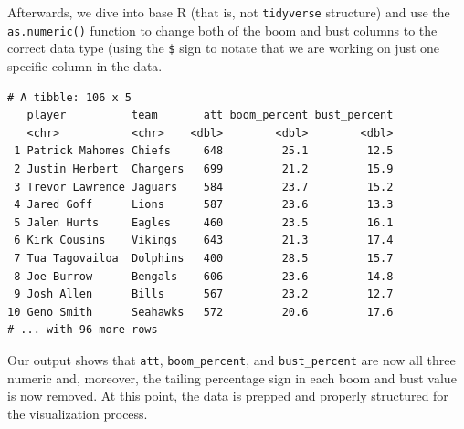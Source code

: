\documentclass[
  letterpaper,
]{krantz}
\newenvironment{Shaded}{\begin{snugshade}}{\end{snugshade}}
\newcommand{\AttributeTok}[1]{\textcolor[rgb]{0.40,0.45,0.13}{#1}}
\newcommand{\FunctionTok}[1]{\textcolor[rgb]{0.28,0.35,0.67}{#1}}
\newcommand{\NormalTok}[1]{\textcolor[rgb]{0.00,0.23,0.31}{#1}}
\newcommand{\OtherTok}[1]{\textcolor[rgb]{0.00,0.23,0.31}{#1}}
\newcommand{\SpecialCharTok}[1]{\textcolor[rgb]{0.37,0.37,0.37}{#1}}
\newcommand{\StringTok}[1]{\textcolor[rgb]{0.13,0.47,0.30}{#1}}
\begin{document}
Afterwards, we dive into base R (that is, not \texttt{tidyverse}
structure) and use the \texttt{as.numeric()} function to change both of
the boom and bust columns to the correct data type (using the
\texttt{\$} sign to notate that we are working on just one specific
column in the data.

\begin{Shaded}
\end{Shaded}

\begin{verbatim}
# A tibble: 106 x 5
   player          team       att boom_percent bust_percent
   <chr>           <chr>    <dbl>        <dbl>        <dbl>
 1 Patrick Mahomes Chiefs     648         25.1         12.5
 2 Justin Herbert  Chargers   699         21.2         15.9
 3 Trevor Lawrence Jaguars    584         23.7         15.2
 4 Jared Goff      Lions      587         23.6         13.3
 5 Jalen Hurts     Eagles     460         23.5         16.1
 6 Kirk Cousins    Vikings    643         21.3         17.4
 7 Tua Tagovailoa  Dolphins   400         28.5         15.7
 8 Joe Burrow      Bengals    606         23.6         14.8
 9 Josh Allen      Bills      567         23.2         12.7
10 Geno Smith      Seahawks   572         20.6         17.6
# ... with 96 more rows
\end{verbatim}

Our output shows that \texttt{att}, \texttt{boom\_percent}, and
\texttt{bust\_percent} are now all three numeric and, moreover, the
tailing percentage sign in each boom and bust value is now removed. At
this point, the data is prepped and properly structured for the
visualization process.
\end{document}
